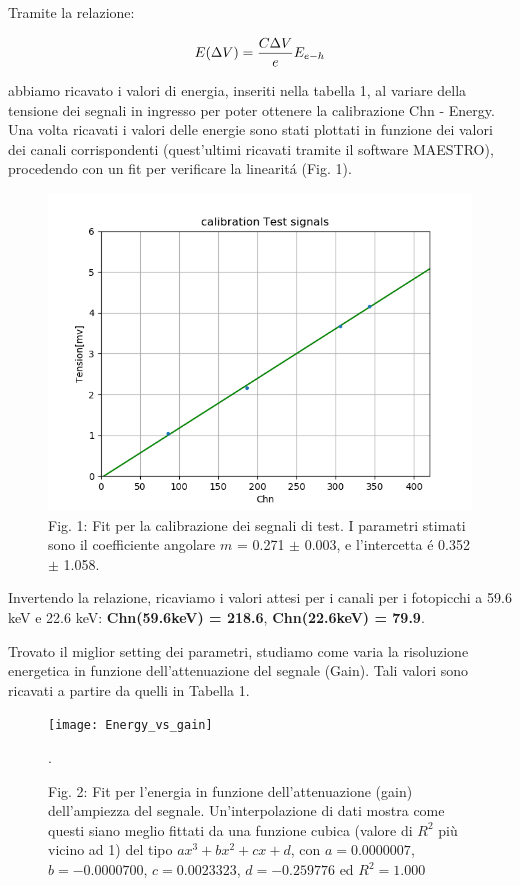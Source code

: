 \documentclass[a4paper]{article}
\begin{document}
Tramite la relazione:

     \begin{equation}
     E(\Delta V) = {{C\Delta V}\over{e}} E_{e-h} 
     \end{equation}

abbiamo ricavato i valori di energia, inseriti nella tabella 1, al variare della tensione dei segnali in ingresso per poter ottenere la calibrazione Chn - Energy. 
Una volta ricavati i valori delle energie sono stati plottati in funzione dei valori dei canali corrispondenti (quest'ultimi ricavati tramite il software MAESTRO), procedendo con un fit per verificare la linearit\'a (Fig. 1).  
\newpage

\begin{figure}[!h]
\includegraphics[width=1\textwidth]{calibration_test_signals}
        \caption{Fig. 1: Fit per la calibrazione dei segnali di test. I parametri stimati sono il coefficiente angolare $m$ = 0.271 $\pm$ 0.003, e l'intercetta \'e 0.352 $\pm$ 1.058.  }
        \label{fig:1}
\end{figure}

Invertendo la relazione, ricaviamo i valori attesi per i canali per i fotopicchi a 59.6 keV e 22.6 keV: \textbf{Chn(59.6keV) = 218.6}, \textbf{Chn(22.6keV) = 79.9}.
\newpage

Trovato il miglior setting dei parametri, studiamo come varia la risoluzione energetica in funzione dell'attenuazione del segnale (Gain). Tali valori sono ricavati a partire da quelli in Tabella 1. 

\begin{figure}[!h]
\texttt{[image: Energy\_vs\_gain]}
        \caption{Fig. 2: Fit per l'energia in funzione dell'attenuazione (gain) dell'ampiezza del segnale. Un'interpolazione di dati mostra come questi siano meglio fittati da una funzione cubica (valore di $R^2$ più vicino ad 1) del tipo $ax^3+bx^2+cx+d$, con $a=0.0000007 $, $b=-0.0000700 $, $c=0.0023323 $, $d=-0.259776 $ ed $R^2=1.000$}.
        \label{fig:2}
\end{figure}
\end{document}
